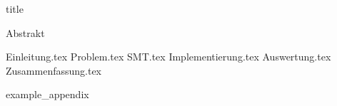 \documentclass{article}
\begin{document}
    {title}

    \frontmatter

    {Abstrakt}
    \newpage

    \tableofcontents


    \mainmatter

    {Einleitung.tex}
    {Problem.tex}
    {SMT.tex}
    {Implementierung.tex}
    {Auswertung.tex}
    {Zusammenfassung.tex}

    \newpage
    \printbibliography[heading = bibintoc, title = Bibliography]    %

    \addappendix
    {example_appendix}
    \newpage

\end{document}
